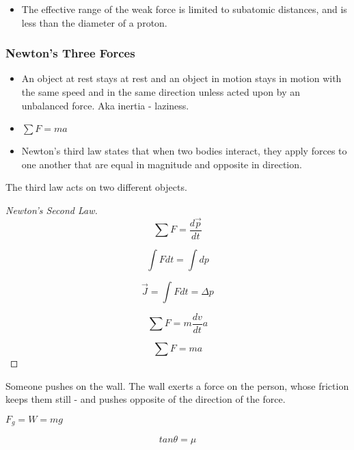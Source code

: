 \documentclass{scrreprt} %
\begin{document}
\begin{itemize}
	\item The effective range of the weak force is limited to subatomic
	distances, and is less than the diameter of a proton.
\end{itemize}

\subsubsection{Newton's Three Forces}

\begin{itemize}
	\item An object at rest stays at rest and an object in motion stays in
	motion with the same speed and in the same direction unless acted upon by an
	unbalanced force. Aka inertia - laziness.
	\item $\sum F = ma$
	\item Newton’s third law states that when two bodies interact, they apply
	forces to one another that are equal in magnitude and opposite in direction.
\end{itemize}

\begin{remark}
	The third law acts on two different objects.
\end{remark}

\begin{proof}[Newton's Second Law]
	
$$\sum F = \frac{d\vec{p}}{dt}$$

$$\int F dt = \int dp $$

$$\vec{J} = \int F dt = \Delta p$$

$$\sum F = m\frac{dv}{dt}a$$

$$\sum F = ma$$

\end{proof}


\begin{example}
Someone pushes on the wall. The wall exerts a force on the person, whose
friction keeps them still -  and pushes opposite of the direction of the
force.
\end{example}

$F_g = W = mg$

\begin{theorem}
	$$tan\theta = \mu$$
\end{theorem}
\end{document}
